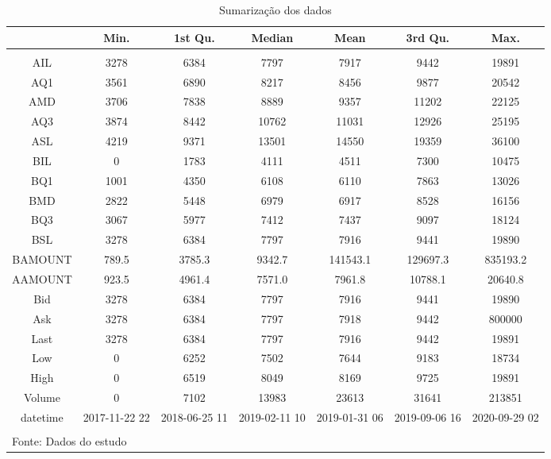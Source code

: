 
\begin{scriptsize}
\begin{longtable}{@{\extracolsep{5pt}} ccccccc} 
  \caption{Sumarização dos dados} 
  \label{summary} 
\\[-1.8ex]\hline 
& Min.    & 1st Qu. & Median  & Mean    & 3rd Qu. & Max.    \\ 
\hline \\[-1.8ex] 
\endhead 
     AIL &  3278   &  6384   &  7797   &  7917   &  9442   & 19891   \\ 
     AQ1 &  3561   &  6890   &  8217   &  8456   &  9877   & 20542   \\ 
     AMD &  3706   &  7838   &  8889   &  9357   & 11202   & 22125   \\ 
     AQ3 &  3874   &  8442   & 10762   & 11031   & 12926   & 25195   \\ 
     ASL &  4219   &  9371   & 13501   & 14550   & 19359   & 36100   \\ 
     BIL &     0   &  1783   &  4111   &  4511   &  7300   & 10475   \\ 
     BQ1 &  1001   &  4350   &  6108   &  6110   &  7863   & 13026   \\ 
     BMD &  2822   &  5448   &  6979   &  6917   &  8528   & 16156   \\ 
     BQ3 &  3067   &  5977   &  7412   &  7437   &  9097   & 18124   \\ 
     BSL &  3278   &  6384   &  7797   &  7916   &  9441   & 19890   \\ 
   BAMOUNT &    789.5   &   3785.3   &   9342.7   & 141543.1   & 129697.3   & 835193.2   \\ 
   AAMOUNT &   923.5   &  4961.4   &  7571.0   &  7961.8   & 10788.1   & 20640.8   \\ 
     Bid &  3278   &  6384   &  7797   &  7916   &  9441   & 19890   \\ 
     Ask &   3278   &   6384   &   7797   &   7918   &   9442   & 800000   \\ 
     Last &  3278   &  6384   &  7797   &  7916   &  9442   & 19891   \\ 
     Low &     0   &  6252   &  7502   &  7644   &  9183   & 18734   \\ 
     High &     0   &  6519   &  8049   &  8169   &  9725   & 19891   \\ 
    Volume &      0   &   7102   &  13983   &  23613   &  31641   & 213851   \\ 
   datetime & 2017-11-22 22 & 2018-06-25 11 & 2019-02-11 10 & 2019-01-31 06 & 2019-09-06 16 & 2020-09-29 02 \\ 
\hline \\[-1.8ex] 
\multicolumn{7}{l}{Fonte: Dados do estudo} \\ 
\end{longtable} 
\end{scriptsize}